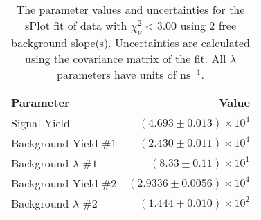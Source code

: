 
\begin{table}
    \begin{center}
        \begin{tabular}{lr}\toprule
            Parameter & Value \\\midrule
            Signal Yield & $(4.693 \pm 0.013) \times 10^{4}$ \\
            Background Yield $\#1$ & $(2.430 \pm 0.011) \times 10^{4}$ \\
            Background $\lambda$ $\#1$ & $(8.33 \pm 0.11) \times 10^{1}$ \\
            Background Yield $\#2$ & $(2.9336 \pm 0.0056) \times 10^{4}$ \\
            Background $\lambda$ $\#2$ & $(1.444 \pm 0.010) \times 10^{2}$ \\\bottomrule
        \end{tabular}
        \caption{The parameter values and uncertainties for the sPlot fit of data with $\chi^2_\nu < 3.00$ using 2 free background slope(s). Uncertainties are calculated using the covariance matrix of the fit. All $\lambda$ parameters have units of $\si{\nano\second}^{-1}$.}
    \end{center}
\end{table}
